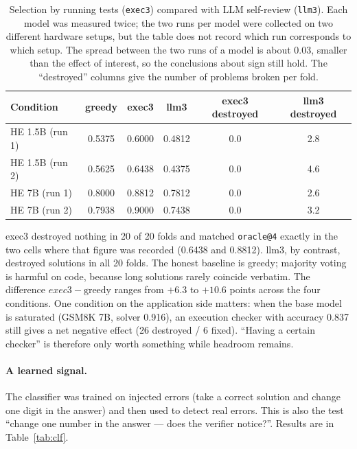 \documentclass[11pt,a4paper]{article}
\begin{document}
\begin{table}[htbp]
\centering
\small
\begin{tabular}{@{}l c c c c c@{}}
\toprule
Condition & greedy & exec3 & llm3 & exec3 destroyed & llm3 destroyed\\
\midrule
HE 1.5B (run 1)  & 0.5375 & 0.6000 & 0.4812 & 0.0 & 2.8\\
HE 1.5B (run 2)    & 0.5625 & 0.6438 & 0.4375 & 0.0 & 4.6\\
HE 7B (run 1)      & 0.8000 & 0.8812 & 0.7812 & 0.0 & 2.6\\
HE 7B (run 2)   & 0.7938 & 0.9000 & 0.7438 & 0.0 & 3.2\\
\bottomrule
\end{tabular}
\caption{Selection by running tests (\texttt{exec3}) compared with LLM self-review (\texttt{llm3}). Each model was measured twice; the two runs per model were collected on two different hardware setups, but the table does not record which run corresponds to which setup. The spread between the two runs of a model is about 0.03, smaller than the effect of interest, so the conclusions about sign still hold. The ``destroyed'' columns give the number of problems broken per fold. }
\label{tab:exec}
\end{table}

exec3 destroyed nothing in 20 of 20 folds and matched \texttt{oracle@4} exactly in the two cells where that figure was recorded (0.6438 and 0.8812). llm3, by contrast, destroyed solutions in all 20 folds. The honest baseline is greedy; majority voting is harmful on code, because long solutions rarely coincide verbatim. The difference $exec3-\text{greedy}$ ranges from $+6.3$ to $+10.6$ points across the four conditions. One condition on the application side matters: when the base model is saturated (GSM8K 7B, solver 0.916), an execution checker with accuracy 0.837 still gives a net negative effect (26 destroyed / 6 fixed). ``Having a certain checker'' is therefore only worth something while headroom remains.

\paragraph{A learned signal.}
The classifier was trained on injected errors (take a correct solution and change one digit in the answer) and then used to detect real errors. This is also the test ``change one number in the answer --- does the verifier notice?''. Results are in Table~\ref{tab:clf}.
\end{document}
